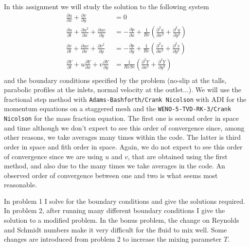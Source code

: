 In this assignment we will study the solution to the following system
\begin{align*}
\frac{\partial u}{\partial x}+\frac{\partial v}{\partial y}&=0\\
\frac{\partial u}{\partial t}+\frac{\partial u^2}{\partial x}+\frac{\partial uv}{\partial y} &=-\frac{\partial p}{\partial x} +\frac{1}{Re}\left(\frac{\partial^2 u}{\partial x^2}+\frac{\partial^2 u}{\partial y^2}\right)\\
\frac{\partial v}{\partial t}+\frac{\partial uv}{\partial x}+\frac{\partial v^2}{\partial y} &=-\frac{\partial p}{\partial y}+ \frac{1}{Re}\left(\frac{\partial^2 v}{\partial x^2}+\frac{\partial^2 v}{\partial y^2}\right)\\
\frac{\partial Y}{\partial t}+u\frac{\partial Y}{\partial x}+v\frac{\partial Y}{\partial y} &= \frac{1}{ReSc}\left(\frac{\partial^2 Y}{\partial x^2}+\frac{\partial^2 Y}{\partial y^2}\right)\\
\end{align*}
and the boundary conditions specified by the problem (no-slip at the talls, parabolic profiles at the inlets, normal velocity at the outlet...). We will use the fractional step method with \texttt{Adams-Bashforth/Crank Nicolson} with ADI for the momentum equations on a staggered mesh and the \texttt{WENO-5-TVD-RK-3/Crank Nicolson} for the mass fraction equation. The first one is second order in space and time although we don't expect to see this order of convergence since, among other reasons, we take averages many times within the code. The latter is third order in space and fith order in space. Again, we do not expect to see this order of convergence since we are using $u$ and $v$, that are obtained using the first method, and also due to the many times we take averages in the code. An observed order of convergence between one and two is what seems most reasonable.

In problem 1 I solve for the boundary conditions and give the solutions required. In problem 2, after running many different boundary conditions I give the solution to a modified problem. In the bonus problem, the change on Reynolds and Schmidt numbers make it very difficult for the fluid to mix well. Some changes are introduced from problem 2 to increase the mixing parameter $T$.